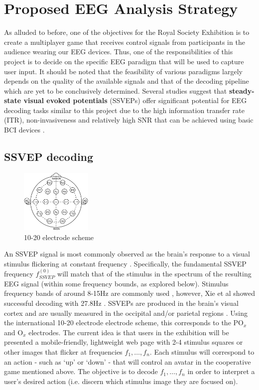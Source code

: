 \section{Proposed EEG Analysis Strategy}
As alluded to before, one of the objectives for the Royal Society Exhibition is to create a multiplayer game that receives control signals from participants in the audience wearing our EEG devices. Thus, one of the responsibilities of this project is to decide on the specific EEG paradigm that will be used to capture user input. It should be noted that the feasibility of various paradigms largely depends on the quality of the available signals and that of the decoding pipeline which are yet to be conclusively determined. Several studies suggest that \textbf{steady-state visual evoked potentials} \cite{Fernandez-Fraga2016}\cite{Kanoga2020}\cite{Acampora2021} (SSVEPs) offer significant potential for EEG decoding tasks similar to this project due to the high information transfer rate (ITR), non-invasiveness and relatively high SNR that can be achieved using basic BCI devices \cite{Zhu2021}. 
\subsection{SSVEP decoding}

\begin{figure} %
\vspace{-1cm}
    \centering
    \includegraphics[height=1.2in]{10-20.png}
    \caption{10-20 electrode scheme}
    \label{fig:c1-10-20}
\end{figure}

An SSVEP signal is most commonly observed as the brain's response to a visual stimulus flickering at constant frequency \cite{Xie2016}. Specifically, the fundamental SSVEP frequency $f_{SSVEP}^{(0)}$ will match that of the stimulus in the spectrum of the resulting EEG signal (within some frequency bounds, as explored below). Stimulus frequency bands of around 8-15Hz are commonly used \cite{Acampora2021}\cite{Chen2017}, however, Xie et al showed successful decoding with 27.8Hz \cite{Xie2016}. SSVEPs are produced in the brain's visual cortex and are usually measured in the occipital and/or parietal regions \cite{Fernandez-Fraga2016}. Using the international 10-20 electrode electrode scheme, this corresponds to the $\text{PO}_x$ and $\text{O}_x$  electrodes. The current idea is that users in the exhibition will be presented a mobile-friendly, lightweight web page with 2-4 stimulus squares or other images that flicker at frequencies $f_1, \dots, f_n$. Each stimulus will correspond to an action - such as `up' or `down' - that will control an avatar in the cooperative game mentioned above. The objective is to decode $f_1, \dots, f_n$ in order to interpret a user's desired action (i.e. discern which stimulus image they are focused on).


